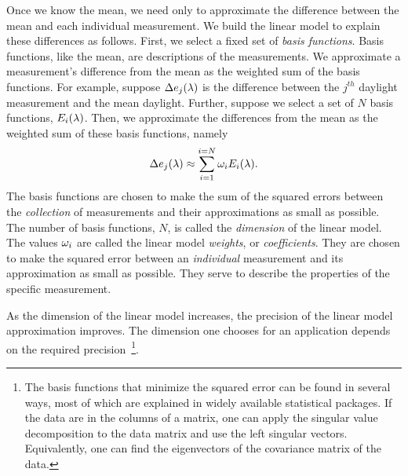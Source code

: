 Once we know the mean, we need only to approximate the difference
between the mean and each individual measurement.  We build the linear
model to explain these differences as follows.  First, we select a
fixed set of {\em basis functions}.  Basis functions, like the mean,
are descriptions of the measurements.  We approximate a measurement's
difference from the mean as the weighted sum of the basis functions.
For example, suppose $\Delta \mbox{$e_{j}(\lambda)$}$ is the difference
between the $j^{th}$ daylight measurement and the mean daylight.
Further, suppose we select a set of $N$ basis functions,
$\mbox{$E_{i}(\lambda)$}$.  Then, we approximate the differences from
the mean as the weighted sum of these basis functions, namely
\begin{equation}
\label{e8:linMod}
\Delta \mbox{$e_{j}(\lambda)$}
  \approx \sum_{i=1}^{i=N} \mbox{$\omega_{i}$} \mbox{$E_{i}(\lambda)$} .
\end{equation}
The basis functions are chosen to make the sum of the squared errors
between the {\em collection} of measurements and their approximations
as small as possible.  The number of basis functions, $N$, is called
the {\em dimension} of the linear model.  The values
$\mbox{$\omega_{i}$}$ are called the linear model {\em weights}, or {\em
coefficients}.  They are chosen to make the squared error between an
{\em individual} measurement and its approximation as small as
possible.  They serve to describe the properties of the specific
measurement.

As the dimension of the linear model increases, the precision of the
linear model approximation improves.  The dimension one chooses for an
application depends on the required precision~\footnote{The basis
functions that minimize the squared error can be found in several
ways, most of which are explained in widely available statistical
packages.  If the data are in the columns of a matrix, one can apply
the singular value decomposition to the data matrix and use the left
singular vectors.  Equivalently, one can find the eigenvectors of the
covariance matrix of the data.}.

